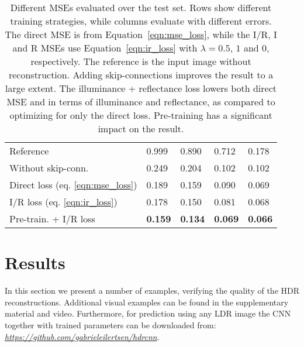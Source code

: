 \documentclass[acmtog]{acmart}
\newcommand{\eqnref}[1]{Equation~\ref{eqn:#1}}
\begin{document}
\begin{table}[b]
	\newcommand\crot{0}
\def\arraystretch{1.4}
	\setlength\tabcolsep{0.3cm}
	\centering
	\caption{Different MSEs evaluated over the test set. Rows show different training strategies, while columns evaluate with different errors. The direct MSE is from \eqnref{mse_loss}, while the I/R, I and R MSEs use \eqnref{ir_loss} with $\lambda = 0.5$, $1$ and $0$, respectively. The reference is the input image without reconstruction. Adding skip-connections improves the result to a large extent. The illuminance + reflectance loss lowers both direct MSE and in terms of illuminance and reflectance, as compared to optimizing for only the direct loss. Pre-training has a significant impact on the result.}
	\begin{tabular}{l|llll}
		&\hspace{0cm}\rotatebox[origin=l]{\crot}{Direct} &
		\hspace{0cm}\rotatebox[origin=l]{\crot}{I/R} &
		\hspace{0cm}\rotatebox[origin=l]{\crot}{I} &
		\hspace{0cm}\rotatebox[origin=l]{\crot}{R}\\
		\hline
		\rowcolor{rc}
		Reference   & 0.999  &  0.890  &  0.712  &  0.178 \\
		Without skip-conn.   & 0.249  &  0.204  &  0.102 &  0.102  \\
		\rowcolor{rc}
		Direct loss (eq. \ref{eqn:mse_loss})    & 0.189  &  0.159  &  0.090  &  0.069  \\
		I/R loss (eq. \ref{eqn:ir_loss}) & 0.178  &  0.150  &  0.081  &  0.068 \\
		\rowcolor{rc}
		Pre-train. + I/R loss & \bf{0.159}  &  \bf{0.134}  &  \bf{0.069} &   \bf{0.066} \\
		
	\end{tabular}
	\label{tab:error}
\end{table}

\section{Results}
In this section we present a number of examples, verifying the quality of the HDR reconstructions. Additional visual examples can be found in the supplementary material and video. Furthermore, for prediction using any LDR image the CNN together with trained parameters can be downloaded from: {\it\url{https://github.com/gabrieleilertsen/hdrcnn}}.
\end{document}
